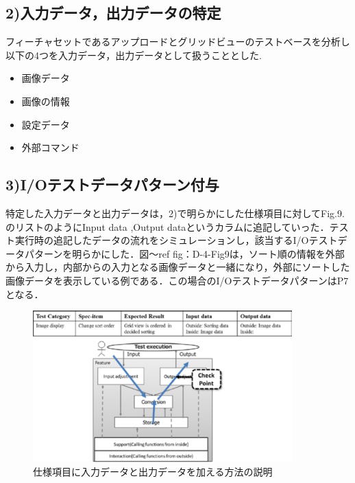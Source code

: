 \subsection{2)入力データ，出力データの特定}
フィーチャセットであるアップロードとグリッドビューのテストベースを分析し以下の4つを入力データ，出力データとして扱うこととした.
\begin{itemize}
 \item 画像データ
 \item 画像の情報
 \item 設定データ
　\item 外部コマンド
\end{itemize}

\subsection{3)I/Oテストデータパターン付与}
特定した入力データと出力データは，2)で明らかにした仕様項目に対してFig.9.のリストのようにInput data ,Output dataというカラムに追記していった．テスト実行時の追記したデータの流れをシミュレーションし，該当するI/Oテストデータパターンを明らかにした．図〜ref {fig：D-4-Fig9}は，ソート順の情報を外部から入力し，内部からの入力となる画像データと一緒になり，外部にソートした画像データを表示している例である．この場合のI/OテストデータパターンはP7となる．

\begin{figure}[htbp]
\begin{center}
\includegraphics[width=10cm]{./image/D-4-Fig9.png}
\caption{仕様項目に入力データと出力データを加える方法の説明}
\label{fig:D-4-Fig9}
\end{center}
\end{figure}

